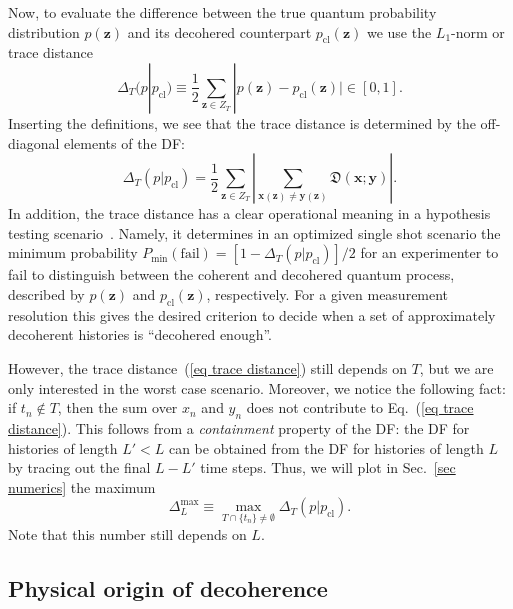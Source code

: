 \documentclass[pre,twocolumn,10pt,aps,longbibliography,nofootinbib]{revtex4-1}
\newcommand{\bb}[1]{\textbf{#1}}
\newcommand{\mf}[1]{{\mathfrak{#1}}}
\newcommand{\new}[1]{#1}
\begin{document}
Now, to evaluate the difference between the true quantum probability distribution $p(\bb z)$ and its decohered counterpart $p_\text{cl}(\bb z)$ we use the $L_1$-norm or trace distance
\begin{equation}\label{eq trace distance}
 \Delta_T(p|p_\text{cl}) \equiv \frac{1}{2}\sum_{\bb z\in Z_T} |p(\bb z)-p_\text{cl}(\bb z)| \in[0,1].
\end{equation}
Inserting the definitions, we see that the trace distance is determined by the off-diagonal elements of the DF:
\begin{equation}
 \Delta_T(p|p_\text{cl}) = \frac{1}{2}\sum_{\bb z\in Z_T} \left|\sum_{\bb x(\bb z)\neq\bb y(\bb z)} \mf{D}(\bb x;\bb y)\right|.
\end{equation}
In addition, the trace distance has a clear operational meaning in a hypothesis testing scenario~\cite{WildeBook2019}. Namely, it determines in an optimized single shot scenario the minimum probability $P_\text{min}(\text{fail}) = [1-\Delta_T(p|p_\text{cl})]/2$ for an experimenter to fail to distinguish between the coherent and decohered quantum process, described by $p(\bb z)$ and $p_\text{cl}(\bb z)$, respectively. For a given measurement resolution this gives the desired criterion to decide when a set of approximately decoherent histories is ``decohered enough''.

However, the trace distance~(\ref{eq trace distance}) still depends on $T$, but we are only interested in the worst case scenario. Moreover, we notice the following fact: if $t_n\notin T$, then the sum over $x_n$ and $y_n$ does not contribute to Eq.~(\ref{eq trace distance}). This follows from a \emph{containment} property of the DF: the DF for histories of length $L'<L$ can be obtained from the DF for histories of length $L$ by tracing out the final $L-L'$ time steps. Thus, we will plot in Sec.~\ref{sec numerics} the maximum
\begin{equation}\label{eq TD max}
 \Delta^\text{max}_L \equiv \max_{T\cap\{t_n\}\neq\emptyset} \Delta_T(p|p_\text{cl}).
\end{equation}
Note that this number still depends on $L$.

\subsection{\new{Physical origin of decoherence}}
\label{sec physical origin}
\end{document}

